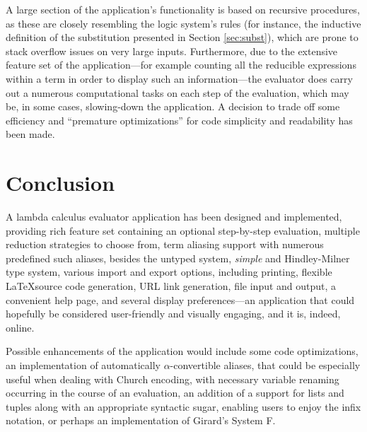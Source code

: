 \documentclass[table, a4paper, 10pt]{article}
\begin{document}
A large section of the application's functionality is based on recursive procedures,
as these are closely resembling the logic system's rules (for instance,
the inductive definition of the substitution presented in Section \ref{sec:subst}),
which are prone to stack overflow issues on very large inputs. Furthermore,
due to the extensive feature set of the application---for
example counting all the reducible expressions within a term in order
to display such an information---the evaluator
does carry out a numerous computational tasks on each step of the evaluation,
which may be, in some cases, slowing-down the application.
A decision to trade off some efficiency and ``premature optimizations'' for code
simplicity and readability has been made.

\newpage
\section{Conclusion}
A lambda calculus evaluator application has been designed and implemented,
providing rich feature set containing an optional step-by-step evaluation,
multiple reduction strategies to choose from, term aliasing support with numerous predefined such aliases,
besides the untyped system, \textit{simple} and Hindley-Milner type system,
various import and export options, including printing, flexible \LaTeX\;source code generation,
URL link generation, file input and output, a convenient help page,
and several display preferences---an application that could hopefully be considered user-friendly
and visually engaging,
and it is, indeed, online.

Possible enhancements of the application would include some code optimizations, an implementation
of automatically $\alpha$-convertible aliases, that could be especially useful 
when dealing with Church encoding, with necessary variable renaming occurring in the course of an
evaluation, an addition of a support for lists and tuples along with an appropriate syntactic sugar,
enabling users to enjoy the infix notation,
or perhaps an implementation of Girard's System F.

\appendix
\end{document}
